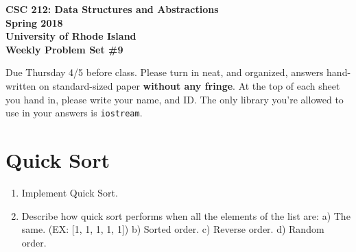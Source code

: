 \documentclass[11pt]{article}
\begin{document}
\thispagestyle{empty}

\begin{center}
    {\Large\bf CSC 212: Data Structures and Abstractions}\\
    \medskip
    {\Large\bf Spring 2018}\\
    \medskip
    {\Large\bf University of Rhode Island}\\
    \bigskip
    {\Large\bf Weekly Problem Set \#9}
\end{center}

Due Thursday 4/5 before class. Please turn in neat, and organized, answers hand-written on standard-sized paper \textbf{without any fringe}. At the top of each sheet you hand in, please write your name, and ID.
The only library you're allowed to use in your answers is \verb|iostream|.

\section{Quick Sort}
\begin{enumerate}
    \item Implement Quick Sort.

    \item Describe how quick sort performs when all the elements of the list are:  a) The same. (EX: [1, 1, 1, 1, 1]) b) Sorted order. c) Reverse order. d) Random order.
\end{enumerate}
\end{document}
